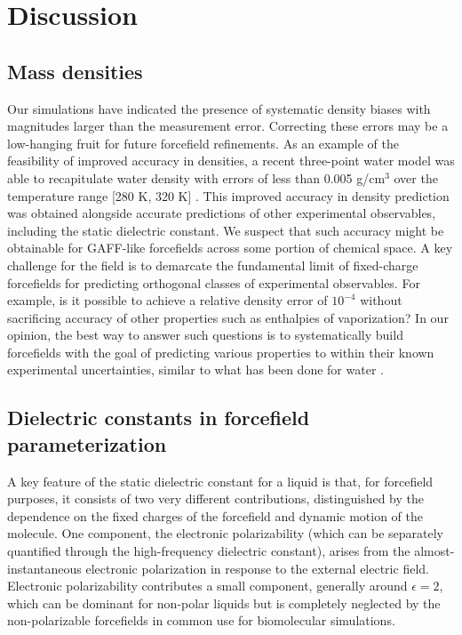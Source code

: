 \documentclass[journal=jacsat,manuscript=article]{achemso}
\begin{document}
\section{Discussion}

\subsection{Mass densities}

Our simulations have indicated the presence of systematic density biases with magnitudes larger than the measurement error.  
Correcting these errors may be a low-hanging fruit for future forcefield refinements.
As an example of the feasibility of improved accuracy in densities, a recent three-point water model was able to recapitulate water density with errors of less than 0.005 g/cm$^{3}$ over the temperature range [280 K, 320 K] \cite{wang2014building}.
This improved accuracy in density prediction was obtained alongside accurate predictions of other experimental observables, including the static dielectric constant.  
We suspect that such accuracy might be obtainable for GAFF-like forcefields across some portion of chemical space.  
A key challenge for the field is to demarcate the fundamental limit of fixed-charge forcefields for predicting orthogonal classes of experimental observables.
For example, is it possible to achieve a relative density error of $10^{-4}$ without sacrificing accuracy of other properties such as enthalpies of vaporization?
In our opinion, the best way to answer such questions is to systematically build forcefields with the goal of predicting various properties to within their known experimental uncertainties, similar to what has been done for water \cite{horn2004, wang2014building}.



\subsection{Dielectric constants in forcefield parameterization}


A key feature of the static dielectric constant for a liquid is that, for forcefield purposes, it consists of two very different contributions, distinguished by the dependence on the fixed charges of the forcefield and dynamic motion of the molecule. 
One component, the electronic polarizability (which can be separately quantified through the high-frequency dielectric constant), arises from the almost-instantaneous electronic polarization in response to the external electric field.
Electronic polarizability contributes a small component, generally around $\epsilon = 2$, which can be dominant for non-polar liquids but is completely neglected by the non-polarizable forcefields in common use for biomolecular simulations. 
\end{document}
